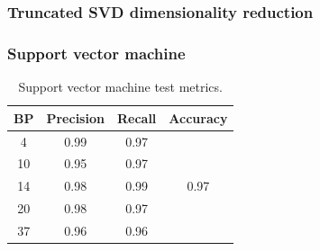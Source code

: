 \documentclass{beamer}
\begin{document}
    \begin{frame}
        \frametitle{Truncated SVD dimensionality reduction}
        \begin{figure}
                \centering
                \qquad
        \end{figure}
    \end{frame}

    \begin{frame}
        \frametitle{Support vector machine}
        \begin{table}[H]
            \centering
            \caption{Support vector machine test metrics.}
            \label{tab:svm}
            \begin{tabular}{c|cc|c}
            BP & Precision & Recall & Accuracy              \\ \hline
            4  & 0.99      & 0.97   & \multirow{5}{*}{0.97} \\
            10 & 0.95      & 0.97   &                       \\
            14 & 0.98      & 0.99   &                       \\
            20 & 0.98      & 0.97   &                       \\
            37 & 0.96      & 0.96   &                      
            \end{tabular}
        \end{table}
    \end{frame}
\end{document}
